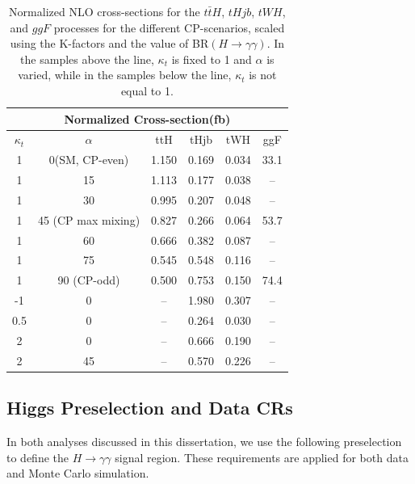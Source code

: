\begin{table}
  \centering
  \begin{tabular}{|c|c||c|c|c|c|}
    \hline
    \multicolumn{6}{|c|}{Normalized Cross-section(fb)} \\
    \hline \hline
    $\kappa_t$ & $\alpha$ & ttH & tHjb & tWH & ggF\\
    \hline
    1 & 0(SM, CP-even)  & 1.150 & 0.169 & 0.034 & 33.1 \\
    1 & 15              & 1.113 & 0.177 & 0.038 & -- \\
    1 & 30              & 0.995 & 0.207 & 0.048 & -- \\
    1 & 45 (CP max mixing)      & 0.827 & 0.266 & 0.064 & 53.7 \\
    1 & 60              & 0.666 & 0.382 & 0.087 & -- \\
    1 & 75              & 0.545 & 0.548 & 0.116 & -- \\
    1 & 90 (CP-odd)     & 0.500 & 0.753 & 0.150 & 74.4 \\
    \hline \hline
    -1 & 0    & -- & 1.980 & 0.307 & -- \\
    0.5 & 0   & -- & 0.264 & 0.030 & -- \\
    2 & 0     & -- & 0.666 & 0.190 & -- \\
    2 & 45    & -- & 0.570 & 0.226 & -- \\
    \hline
  \end{tabular}
  \caption{Normalized NLO cross-sections for the $t\bar{t}H$, $tHjb$, $tWH$, and $ggF$ processes for the different CP-scenarios, scaled using the K-factors and the value of BR$(H\rightarrow\gamma\gamma)$. In the samples above the line, $\kappa_{t}$ is fixed to 1 and $\alpha$ is varied, while in the samples below the line, $\kappa_{t}$ is not equal to 1.}
  \label{tab:MCsamples_XS_norm}
\end{table}


\subsection{Higgs Preselection and Data CRs} \label{sec:Preselection} 

In both analyses discussed in this dissertation, we use the following preselection to define the $H \rightarrow \gamma \gamma$ signal region. These requirements are applied for both data and Monte Carlo simulation. 

